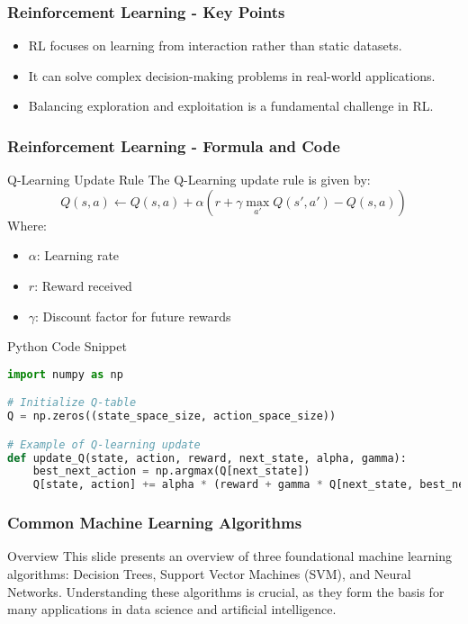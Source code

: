 \documentclass[aspectratio=169]{beamer}
\begin{document}
\begin{frame}[fragile]
    \frametitle{Reinforcement Learning - Key Points}
    \begin{itemize}
        \item RL focuses on learning from interaction rather than static datasets.
        \item It can solve complex decision-making problems in real-world applications.
        \item Balancing exploration and exploitation is a fundamental challenge in RL.
    \end{itemize}
\end{frame}

\begin{frame}[fragile]
    \frametitle{Reinforcement Learning - Formula and Code}
    \begin{block}{Q-Learning Update Rule}
        The Q-Learning update rule is given by:
        \begin{equation}
            Q(s, a) \leftarrow Q(s, a) + \alpha \left( r + \gamma \max_{a'} Q(s', a') - Q(s, a) \right)
        \end{equation}
        Where:
        \begin{itemize}
            \item $\alpha$: Learning rate
            \item $r$: Reward received
            \item $\gamma$: Discount factor for future rewards
        \end{itemize}
    \end{block}

    \begin{block}{Python Code Snippet}
        \begin{lstlisting}[language=Python]
import numpy as np

# Initialize Q-table
Q = np.zeros((state_space_size, action_space_size))

# Example of Q-learning update
def update_Q(state, action, reward, next_state, alpha, gamma):
    best_next_action = np.argmax(Q[next_state])
    Q[state, action] += alpha * (reward + gamma * Q[next_state, best_next_action] - Q[state, action])
        \end{lstlisting}
    \end{block}
\end{frame}

\begin{frame}
    \frametitle{Common Machine Learning Algorithms}
    \begin{block}{Overview}
        This slide presents an overview of three foundational machine learning algorithms: Decision Trees, Support Vector Machines (SVM), and Neural Networks. Understanding these algorithms is crucial, as they form the basis for many applications in data science and artificial intelligence.
    \end{block}
\end{frame}
\end{document}

